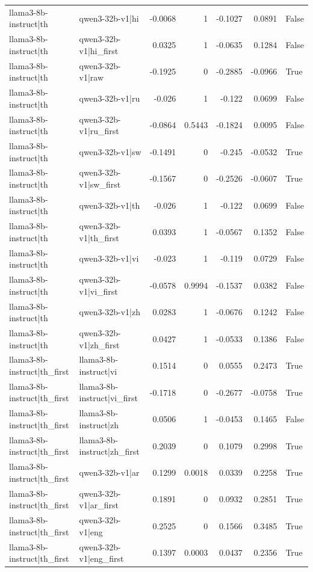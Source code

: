 \begin{table}
\begin{tabular}{l l r r r r l}
llama3-8b-instruct|th & qwen3-32b-v1|hi & -0.0068 & 1 & -0.1027 & 0.0891 & False \\
llama3-8b-instruct|th & qwen3-32b-v1|hi_first & 0.0325 & 1 & -0.0635 & 0.1284 & False \\
llama3-8b-instruct|th & qwen3-32b-v1|raw & -0.1925 & 0 & -0.2885 & -0.0966 & True \\
llama3-8b-instruct|th & qwen3-32b-v1|ru & -0.026 & 1 & -0.122 & 0.0699 & False \\
llama3-8b-instruct|th & qwen3-32b-v1|ru_first & -0.0864 & 0.5443 & -0.1824 & 0.0095 & False \\
llama3-8b-instruct|th & qwen3-32b-v1|sw & -0.1491 & 0 & -0.245 & -0.0532 & True \\
llama3-8b-instruct|th & qwen3-32b-v1|sw_first & -0.1567 & 0 & -0.2526 & -0.0607 & True \\
llama3-8b-instruct|th & qwen3-32b-v1|th & -0.026 & 1 & -0.122 & 0.0699 & False \\
llama3-8b-instruct|th & qwen3-32b-v1|th_first & 0.0393 & 1 & -0.0567 & 0.1352 & False \\
llama3-8b-instruct|th & qwen3-32b-v1|vi & -0.023 & 1 & -0.119 & 0.0729 & False \\
llama3-8b-instruct|th & qwen3-32b-v1|vi_first & -0.0578 & 0.9994 & -0.1537 & 0.0382 & False \\
llama3-8b-instruct|th & qwen3-32b-v1|zh & 0.0283 & 1 & -0.0676 & 0.1242 & False \\
llama3-8b-instruct|th & qwen3-32b-v1|zh_first & 0.0427 & 1 & -0.0533 & 0.1386 & False \\
llama3-8b-instruct|th_first & llama3-8b-instruct|vi & 0.1514 & 0 & 0.0555 & 0.2473 & True \\
llama3-8b-instruct|th_first & llama3-8b-instruct|vi_first & -0.1718 & 0 & -0.2677 & -0.0758 & True \\
llama3-8b-instruct|th_first & llama3-8b-instruct|zh & 0.0506 & 1 & -0.0453 & 0.1465 & False \\
llama3-8b-instruct|th_first & llama3-8b-instruct|zh_first & 0.2039 & 0 & 0.1079 & 0.2998 & True \\
llama3-8b-instruct|th_first & qwen3-32b-v1|ar & 0.1299 & 0.0018 & 0.0339 & 0.2258 & True \\
llama3-8b-instruct|th_first & qwen3-32b-v1|ar_first & 0.1891 & 0 & 0.0932 & 0.2851 & True \\
llama3-8b-instruct|th_first & qwen3-32b-v1|eng & 0.2525 & 0 & 0.1566 & 0.3485 & True \\
llama3-8b-instruct|th_first & qwen3-32b-v1|eng_first & 0.1397 & 0.0003 & 0.0437 & 0.2356 & True \\

\end{tabular}
\end{table}
